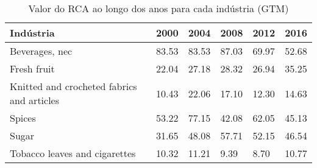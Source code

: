 \begin{table}
\centering
\caption{Valor do RCA ao longo dos anos para cada indústria (GTM)}
\label{tab:ex3-tempo-GTM}
\begin{tabular}{p{6cm}p{1.5cm}p{1.5cm}p{1.5cm}p{1.5cm}p{1.5cm}}
\toprule
                                 Indústria &  2000 &  2004 &  2008 &  2012 &  2016 \\
\midrule
                            Beverages, nec & 83.53 & 83.53 & 87.03 & 69.97 & 52.68 \\
                               Fresh fruit & 22.04 & 27.18 & 28.32 & 26.94 & 35.25 \\
Knitted and crocheted fabrics and articles & 10.43 & 22.06 & 17.10 & 12.30 & 14.63 \\
                                    Spices & 53.22 & 77.15 & 42.08 & 62.05 & 45.13 \\
                                     Sugar & 31.65 & 48.08 & 57.71 & 52.15 & 46.54 \\
             Tobacco leaves and cigarettes & 10.32 & 11.21 &  9.39 &  8.70 & 10.77 \\
\bottomrule
\end{tabular}
\end{table}
